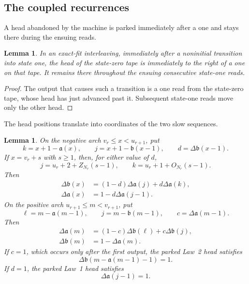 \documentclass[11pt]{article}
\newtheorem{lemma}[theorem]{Lemma}
\theoremstyle{definition}
\theoremstyle{remark}
\begin{document}
\subsection{The coupled recurrences}

A head abandoned by the machine is parked immediately after a one and stays there during the ensuing reads.
\begin{lemma}
\label{lem:parked-head-invariant}
In an exact-fit interleaving, immediately after a noninitial transition into
state one, the head of the state-zero tape is immediately to the right of a
one on that tape.  It remains there throughout the ensuing consecutive
state-one reads.
\end{lemma}

\begin{proof}
The output that causes such a transition is a one read from the state-zero
tape, whose head has just advanced past it.  Subsequent state-one reads move
only the other head.
\end{proof}

The head positions translate into coordinates of the two slow sequences.
\begin{lemma}

On the negative arch \(v_r\leq x<u_{r+1}\), put
\[
 k=x+1-\mathfrak a(x),
 \qquad j=x+1-\mathfrak b(x-1),
 \qquad d=\Delta \mathfrak b(x-1).
\]
If \(x=v_r+s\) with \(s\geq1\), then, for either value of \(d\),
\begin{equation}
\label{eq:negative-head-coordinates}
 j=u_r+2+Z_{N_r}(s-1),
 \qquad
 k=u_r+1+O_{N_r}(s-1).
\end{equation}
Then
\begin{align}
\label{eq:L1B}
 \Delta \mathfrak b(x)&=(1-d)\Delta \mathfrak a(j)+d\Delta \mathfrak a(k),\\
\label{eq:L1A}
 \Delta \mathfrak a(x)&=1-d\Delta \mathfrak a(j-1).
\end{align}
On the positive arch \(u_{r+1}\leq m<v_{r+1}\), put
\[
 \ell=m-\mathfrak a(m-1),
 \qquad j=m-\mathfrak b(m-1),
 \qquad c=\Delta \mathfrak a(m-1).
\]
Then
\begin{align}
\label{eq:L2A}
 \Delta \mathfrak a(m)&=(1-c)\Delta \mathfrak b(\ell)+c\Delta \mathfrak b(j),\\
\label{eq:L2B}
 \Delta \mathfrak b(m)&=1-\Delta \mathfrak a(m).
\end{align}
If \(c=1\), which occurs only after the first output, the parked Law~2 head satisfies
\begin{equation}
\label{eq:parked-positive}
 \Delta \mathfrak b(m-\mathfrak a(m-1)-1)=1.
\end{equation}
If \(d=1\), the parked Law~1 head satisfies
\begin{equation}
\label{eq:parked-negative}
 \Delta \mathfrak a(j-1)=1.
\end{equation}
\end{lemma}
\end{document}
